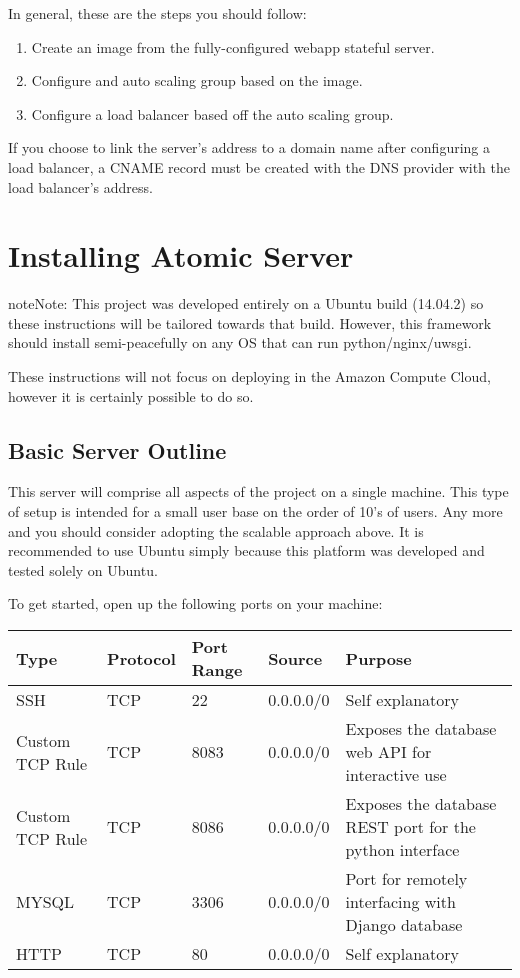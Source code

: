 \documentclass[letterpaper,10pt,english]{sphinxmanual}
\begin{document}
In general, these are the steps you should follow:
\begin{enumerate}
\item {} 
Create an image from the fully-configured webapp stateful server.

\item {} 
Configure and auto scaling group based on the image.

\item {} 
Configure a load balancer based off the auto scaling group.

\end{enumerate}

If you choose to link the server's address to a domain name after configuring a load balancer, a CNAME record must be created with the DNS provider with the load balancer's address.


\section{Installing Atomic Server}
\label{installation:installing-atomic-server}
\begin{notice}{note}{Note:}
This project was developed entirely on a Ubuntu build (14.04.2) so these instructions will be tailored towards that build. However, this framework should install semi-peacefully on any OS that can run python/nginx/uwsgi.

These instructions will not focus on deploying in the Amazon Compute Cloud, however it is certainly possible to do so.
\end{notice}


\subsection{Basic Server Outline}
\label{installation:id2}
This server will comprise all aspects of the project on a single machine. This type of setup is intended for a small user base on the order of 10's of users. Any more and you should consider adopting the scalable approach above. It is recommended to use Ubuntu simply because this platform was developed and tested solely on Ubuntu.

To get started, open up the following ports on your machine:

\begin{tabulary}{\linewidth}{|L|L|L|L|L|}
\hline
\textsf{\relax 
Type
} & \textsf{\relax 
Protocol
} & \textsf{\relax 
Port Range
} & \textsf{\relax 
Source
} & \textsf{\relax 
Purpose
}\\
\hline
SSH
 & 
TCP
 & 
22
 & 
0.0.0.0/0
 & 
Self explanatory
\\
\hline
Custom TCP Rule
 & 
TCP
 & 
8083
 & 
0.0.0.0/0
 & 
Exposes the database web API for interactive use
\\
\hline
Custom TCP Rule
 & 
TCP
 & 
8086
 & 
0.0.0.0/0
 & 
Exposes the database REST port for the python interface
\\
\hline
MYSQL
 & 
TCP
 & 
3306
 & 
0.0.0.0/0
 & 
Port for remotely interfacing with Django database
\\
\hline
HTTP
 & 
TCP
 & 
80
 & 
0.0.0.0/0
 & 
Self explanatory
\\
\hline\end{tabulary}
\end{document}
